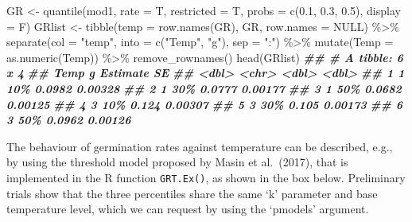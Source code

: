 \documentclass[
]{book}
\newenvironment{Shaded}{\begin{snugshade}}{\end{snugshade}}
\newcommand{\AttributeTok}[1]{\textcolor[rgb]{0.77,0.63,0.00}{#1}}
\newcommand{\ConstantTok}[1]{\textcolor[rgb]{0.00,0.00,0.00}{#1}}
\newcommand{\DocumentationTok}[1]{\textcolor[rgb]{0.56,0.35,0.01}{\textbf{\textit{#1}}}}
\newcommand{\FloatTok}[1]{\textcolor[rgb]{0.00,0.00,0.81}{#1}}
\newcommand{\FunctionTok}[1]{\textcolor[rgb]{0.00,0.00,0.00}{#1}}
\newcommand{\NormalTok}[1]{#1}
\newcommand{\OtherTok}[1]{\textcolor[rgb]{0.56,0.35,0.01}{#1}}
\newcommand{\SpecialCharTok}[1]{\textcolor[rgb]{0.00,0.00,0.00}{#1}}
\newcommand{\StringTok}[1]{\textcolor[rgb]{0.31,0.60,0.02}{#1}}
\begin{document}
\begin{Shaded}
\begin{Highlighting}[]
\NormalTok{GR }\OtherTok{\textless{}{-}} \FunctionTok{quantile}\NormalTok{(mod1, }\AttributeTok{rate =}\NormalTok{ T, }\AttributeTok{restricted =}\NormalTok{ T, }
               \AttributeTok{probs =} \FunctionTok{c}\NormalTok{(}\FloatTok{0.1}\NormalTok{, }\FloatTok{0.3}\NormalTok{, }\FloatTok{0.5}\NormalTok{),}
                \AttributeTok{display =}\NormalTok{ F)}
\NormalTok{GRlist }\OtherTok{\textless{}{-}} \FunctionTok{tibble}\NormalTok{(}\AttributeTok{temp =} \FunctionTok{row.names}\NormalTok{(GR), GR, }\AttributeTok{row.names =} \ConstantTok{NULL}\NormalTok{) }\SpecialCharTok{\%\textgreater{}\%} 
  \FunctionTok{separate}\NormalTok{(}\AttributeTok{col =} \StringTok{"temp"}\NormalTok{, }\AttributeTok{into =} \FunctionTok{c}\NormalTok{(}\StringTok{"Temp"}\NormalTok{, }\StringTok{"g"}\NormalTok{),}
           \AttributeTok{sep =} \StringTok{":"}\NormalTok{) }\SpecialCharTok{\%\textgreater{}\%} 
  \FunctionTok{mutate}\NormalTok{(}\AttributeTok{Temp =} \FunctionTok{as.numeric}\NormalTok{(Temp)) }\SpecialCharTok{\%\textgreater{}\%} 
  \FunctionTok{remove\_rownames}\NormalTok{()}
\FunctionTok{head}\NormalTok{(GRlist)}
\DocumentationTok{\#\# \# A tibble: 6 x 4}
\DocumentationTok{\#\#    Temp g     Estimate      SE}
\DocumentationTok{\#\#   \textless{}dbl\textgreater{} \textless{}chr\textgreater{}    \textless{}dbl\textgreater{}   \textless{}dbl\textgreater{}}
\DocumentationTok{\#\# 1     1 10\%     0.0982 0.00328}
\DocumentationTok{\#\# 2     1 30\%     0.0777 0.00177}
\DocumentationTok{\#\# 3     1 50\%     0.0682 0.00125}
\DocumentationTok{\#\# 4     3 10\%     0.124  0.00307}
\DocumentationTok{\#\# 5     3 30\%     0.105  0.00173}
\DocumentationTok{\#\# 6     3 50\%     0.0962 0.00126}
\end{Highlighting}
\end{Shaded}

The behaviour of germination rates against temperature can be described, e.g., by using the threshold model proposed by Masin et al.~(2017), that is implemented in the R function \texttt{GRT.Ex()}, as shown in the box below. Preliminary trials show that the three percentiles share the same `k' parameter and base temperature level, which we can request by using the `pmodels' argument.
\end{document}
